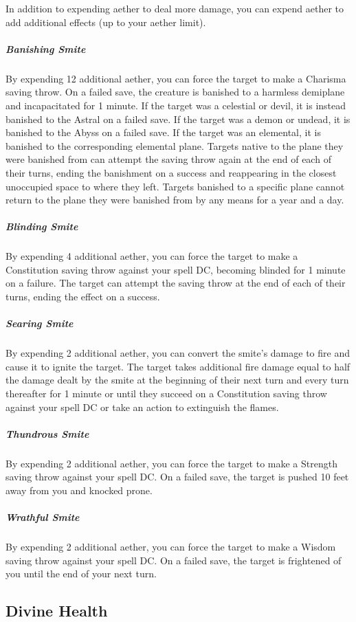 In addition to expending aether to deal more damage, you can expend aether to add additional effects (up to your aether limit).

\subparagraph*{Banishing Smite} By expending 12 additional aether, you can force the target to make a Charisma saving throw. On a failed save, the creature is banished to a harmless demiplane and incapacitated for 1 minute. If the target was a celestial or devil, it is instead banished to the Astral on a failed save. If the target was a demon or undead, it is banished to the Abyss on a failed save. If the target was an elemental, it is banished to the corresponding elemental plane. Targets native to the plane they were banished from can attempt the saving throw again at the end of each of their turns, ending the banishment on a success and reappearing in the closest unoccupied space to where they left. Targets banished to a specific plane cannot return to the plane they were banished from by any means for a year and a day.

\subparagraph*{Blinding Smite} By expending 4 additional aether, you can force the target to make a Constitution saving throw against your spell DC, becoming blinded for 1 minute on a failure. The target can attempt the saving throw at the end of each of their turns, ending the effect on a success.

\subparagraph*{Searing Smite} By expending 2 additional aether, you can convert the smite's damage to fire and cause it to ignite the target. The target takes additional fire damage equal to half the damage dealt by the smite at the beginning of their next turn and every turn thereafter for 1 minute or until they succeed on a Constitution saving throw against your spell DC or take an action to extinguish the flames.

\subparagraph*{Thundrous Smite} By expending 2 additional aether, you can force the target to make a Strength saving throw against your spell DC. On a failed save, the target is pushed 10 feet away from you and knocked prone.

\subparagraph*{Wrathful Smite} By expending 2 additional aether, you can force the target to make a Wisdom saving throw against your spell DC. On a failed save, the target is frightened of you until the end of your next turn.

\subsection{Divine Health}

